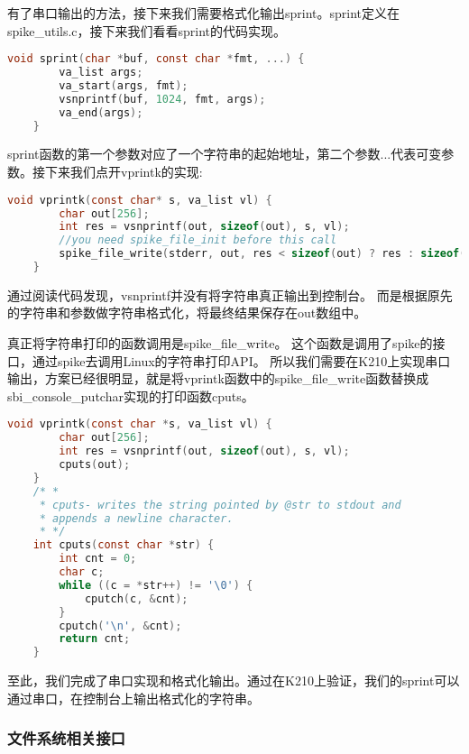 有了串口输出的方法，接下来我们需要格式化输出sprint。sprint定义在spike\_utils.c，接下来我们看看sprint的代码实现。

\begin{lstlisting}[language=C, caption={sprint实现代码}, label={lst:sprint} ]
    void sprint(char *buf, const char *fmt, ...) {
        va_list args;
        va_start(args, fmt);
        vsnprintf(buf, 1024, fmt, args);
        va_end(args);
    }
\end{lstlisting}

sprint函数的第一个参数对应了一个字符串的起始地址，第二个参数...代表可变参数。接下来我们点开vprintk的实现:

\begin{lstlisting}[language=C, caption={vprintk实现代码}, label={lst:vprintk} ]
    void vprintk(const char* s, va_list vl) {
        char out[256];
        int res = vsnprintf(out, sizeof(out), s, vl);
        //you need spike_file_init before this call
        spike_file_write(stderr, out, res < sizeof(out) ? res : sizeof(out));
    }
\end{lstlisting}

通过阅读代码发现，vsnprintf并没有将字符串真正输出到控制台。
而是根据原先的字符串和参数做字符串格式化，将最终结果保存在out数组中。

真正将字符串打印的函数调用是spike\_file\_write。
这个函数是调用了spike的接口，通过spike去调用Linux的字符串打印API。
所以我们需要在K210上实现串口输出，方案已经很明显，就是将vprintk函数中的spike\_file\_write函数替换成sbi\_console\_putchar实现的打印函数cputs。

\begin{lstlisting}[language=C, caption={vprintk改造代码}, label={lst:vprintk_dev} ]
    void vprintk(const char *s, va_list vl) {
        char out[256];
        int res = vsnprintf(out, sizeof(out), s, vl);
        cputs(out);
    }
    /* *
     * cputs- writes the string pointed by @str to stdout and
     * appends a newline character.
     * */
    int cputs(const char *str) {
        int cnt = 0;
        char c;
        while ((c = *str++) != '\0') {
            cputch(c, &cnt);
        }
        cputch('\n', &cnt);
        return cnt;
    }   
\end{lstlisting}

至此，我们完成了串口实现和格式化输出。通过在K210上验证，我们的sprint可以通过串口，在控制台上输出格式化的字符串。

\subsubsection{文件系统相关接口}

